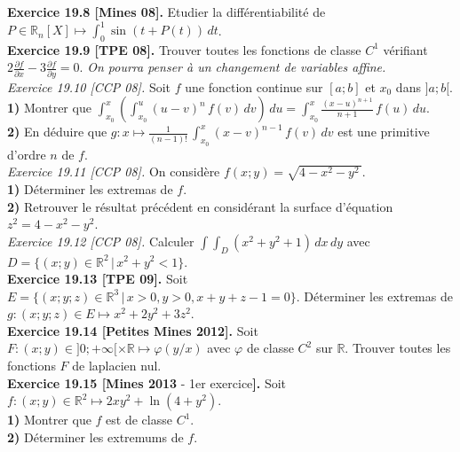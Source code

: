 \documentclass[a4paper,12pt,francais]{article}
\newcommand{\field}[1]{\mathbb{#1}}
\newcommand{\R}{\field{R}}
\begin{document}
\noindent
{\bf Exercice 19.8 [Mines 08].} Etudier la différentiabilité de $P\displaystyle \in \R_n[X]\mapsto \int_0^1 \sin (t+P(t))\, dt$.\\

\noindent
{\bf Exercice 19.9 [TPE 08].} Trouver toutes les fonctions de classe $C^1$ vérifiant $2\frac{\partial f}{\partial x}-3\frac{\partial f}{\partial y}=0$. {\it On pourra penser à un changement de variables affine.}\\ 

\noindent
{\it  Exercice 19.10 [CCP 08].} Soit $f$ une fonction continue sur $[a;b]$ et $x_0$ dans $]a;b[$.\\
{\bf 1)} Montrer que $\displaystyle  \int_{x_0}^x \left({ \int_{x_0}^u (u-v)^n \, f(v) \, dv }\right) \, du = \int_{x_0}^x \frac{(x-u)^{n+1}}{n+1} \, f(u) \, du$.\\
{\bf 2)} En déduire que $\displaystyle g:x \mapsto \frac{1}{(n-1)!} \, \int_{x_0}^x (x-v)^{n-1} \, f(v) \, dv$ est une primitive d'ordre $n$ de $f$.\\

\noindent
{\it  Exercice 19.11 [CCP 08].} On considère $f(x;y)=\sqrt{4-x^2-y^2\,}$.\\
{\bf 1)} Déterminer les extremas de $f$.\\
{\bf 2)} Retrouver le résultat précédent en considérant la surface d'équation $z^2=4-x^2-y^2$.\\

\noindent
{\it  Exercice 19.12 [CCP 08].} Calculer $\int \! \!  \int_D (x^2+y^2+1)\, dx\, dy$ avec $D=\{(x;y)\in\R^2\, | \, x^2+y^2<1\}$.\\

\noindent
{\bf Exercice 19.13 [TPE 09].} Soit $E=\{(x;y;z)\in \R^3 \, | \, x> 0, y> 0, x+y+z-1=0\}$. Déterminer les extremas de $g:(x;y;z)\in E \mapsto x^2+2y^2+3z^2$.\\

\noindent
{\bf Exercice 19.14 [Petites Mines 2012].} Soit $F: (x;y)\in ]0;+\infty[ \times \R \mapsto \varphi(y/x)$ avec $\varphi$ de classe $C^2$ sur $\R$. Trouver toutes les fonctions $F$ de laplacien nul.\\

\noindent
{\bf Exercice 19.15 [Mines 2013} - 1er exercice{\bf].} Soit $f: (x;y) \in \R^2 \mapsto 2xy^2+\ln(4+y^2)$.\\
{\bf 1)} Montrer que $f$ est de classe $C^1$.\\
{\bf 2)} Déterminer les extremums de $f$.\\
\end{document}

